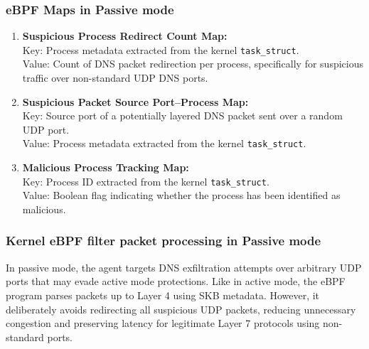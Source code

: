 \documentclass [11pt, proquest] {uwthesis}[2020/02/24]
\begin{document}
\subsubsection{\textbf{eBPF Maps in Passive mode}}
\label{sec:passive-maps}
\begin{enumerate}[itemsep=1pt,parsep=0pt]

\item \textbf{Suspicious Process Redirect Count Map:} \\
Key: Process metadata extracted from the kernel \texttt{task\_struct}. \\
Value: Count of DNS packet redirection per process, specifically for suspicious traffic over non-standard UDP DNS ports.

\item \textbf{Suspicious Packet Source Port–Process Map:} \\
Key: Source port of a potentially layered DNS packet sent over a random UDP port. \\
Value: Process metadata extracted from the kernel \texttt{task\_struct}.

\item \textbf{Malicious Process Tracking Map:} \\
Key: Process ID extracted from the kernel \texttt{task\_struct}. \\
Value: Boolean flag indicating whether the process has been identified as malicious.
\end{enumerate}

\subsubsection{Kernel eBPF filter packet processing in \textbf{Passive} mode}
\label{passive:sec1}
In passive mode, the agent targets DNS exfiltration attempts over arbitrary UDP ports that may evade active mode protections. Like in active mode, the eBPF program parses packets up to Layer 4 using SKB metadata. However, it deliberately avoids redirecting all suspicious UDP packets, reducing unnecessary congestion and preserving latency for legitimate Layer 7 protocols using non-standard ports.
\end{document}
